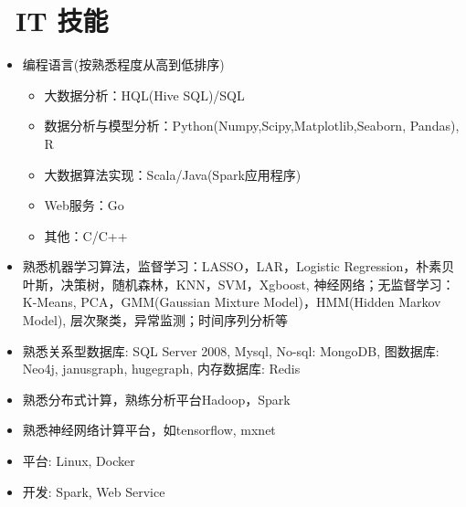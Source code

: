 \documentclass{resume}
\begin{document}

\section{\faCogs\ IT 技能}
\begin{itemize}[parsep=0.5ex]
   \item 编程语言(按熟悉程度从高到低排序)
     \begin{itemize}
      \item 大数据分析：HQL(Hive SQL)/SQL
      \item 数据分析与模型分析：Python(Numpy,Scipy,Matplotlib,Seaborn, Pandas), R
      \item 大数据算法实现：Scala/Java(Spark应用程序)
      \item Web服务：Go
      \item 其他：C/C++      
     \end{itemize}		     
  \item 熟悉机器学习算法，监督学习：LASSO，LAR，Logistic Regression，朴素贝叶斯，决策树，随机森林，KNN，SVM，Xgboost, 神经网络；无监督学习：K-Means, PCA，GMM(Gaussian Mixture Model)，HMM(Hidden Markov Model), 层次聚类，异常监测；时间序列分析等
  \item 熟悉关系型数据库: SQL Server 2008, Mysql, No-sql: MongoDB, 图数据库: Neo4j, janusgraph, hugegraph, 内存数据库: Redis	  
  \item 熟悉分布式计算，熟练分析平台Hadoop，Spark
  \item 熟悉神经网络计算平台，如tensorflow, mxnet	  
  \item 平台: Linux, Docker
  \item 开发: Spark, Web Service
\end{itemize}
\end{document}
